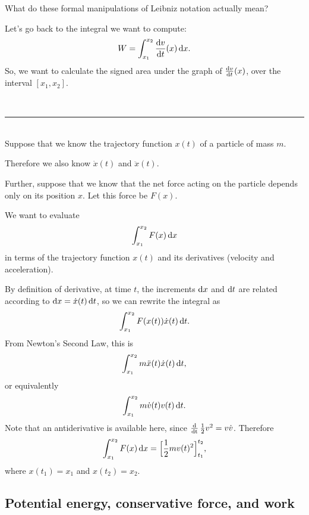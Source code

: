 What do these formal manipulations of Leibniz notation actually mean?

Let's go back to the integral we want to compute:
\begin{align*}
  W = \int_{x_1}^{x_2} \dvdt(x) \dx.
\end{align*}
So, we want to calculate the signed area under the graph of $\dvdt(x)$, over the interval
$[x_1, x_2]$.

~\\\hrule~\\

Suppose that we know the trajectory function $x(t)$ of a particle of mass $m$.

Therefore we also know $\dot{x}(t)$ and $\ddot{x}(t)$.

Further, suppose that we know that the net force acting on the particle depends only on its position
$x$. Let this force be $F(x)$.

We want to evaluate
\begin{align*}
  \int_{x_1}^{x_2} F(x) \dx
\end{align*}
in terms of the trajectory function $x(t)$ and its derivatives (velocity and acceleration).

By definition of derivative, at time $t$, the increments $\dx$ and $\dt$ are related according to
$\dx = \dot{x}(t)\dt$, so we can rewrite the integral as
\begin{align*}
  \int_{x_1}^{x_2} F(x(t)) \dot{x}(t)\dt.
\end{align*}
From Newton's Second Law, this is
\begin{align*}
  \int_{x_1}^{x_2} m\ddot{x}(t) \dot{x}(t)\dt,
\end{align*}
or equivalently
\begin{align*}
  \int_{x_1}^{x_2} m\dot{v}(t) v(t)\dt.
\end{align*}
Note that an antiderivative is available here, since $\operatorname{\frac{\text{d}}{\text{dt}}} \frac{1}{2}v^2 = v\dot{v}$. Therefore
\begin{align*}
  \int_{x_1}^{x_2} F(x) \dx = \Big[\frac{1}{2}mv(t)^2\Big]_{t_1}^{t_2},
\end{align*}
where $x(t_1) = x_1$ and $x(t_2) = x_2$. 



\subsection{Potential energy, conservative force, and work}


